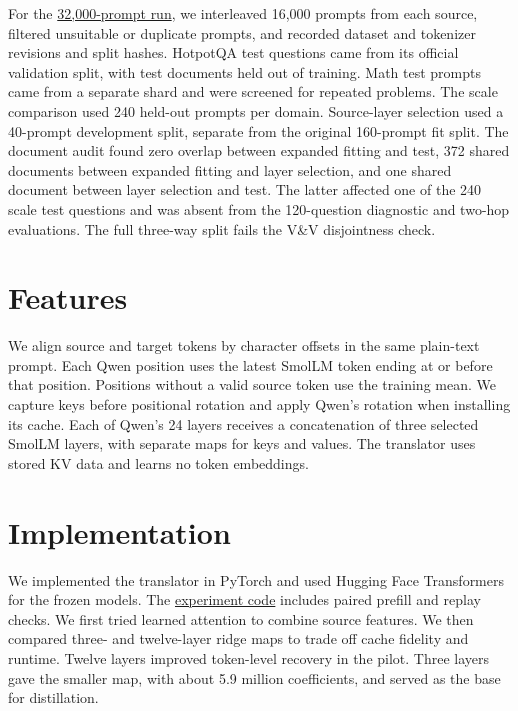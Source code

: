 \documentclass[11pt]{article}
\begin{document}
For the \href{https://huggingface.co/datasets/tandemkv/paired-kv-qwen-smollm/tree/27744a02d7d5f0abe61216612c46ec3b2a0bb52e/experiments/ridge-32k.C70bPO}{32,000-prompt run},
we interleaved 16,000 prompts from each source, filtered unsuitable or
duplicate prompts, and recorded dataset and tokenizer revisions and
split hashes. HotpotQA test questions came from its official validation
split, with test documents held out of training. Math test prompts came
from a separate shard and were screened for repeated problems. The
scale comparison used 240 held-out prompts per domain. Source-layer
selection used a 40-prompt development split, separate from the
original 160-prompt fit split. The document audit found zero overlap
between expanded fitting and test, 372 shared documents between
expanded fitting and layer selection, and one shared document between
layer selection and test. The latter affected one of the 240 scale
test questions and was absent from the 120-question diagnostic and
two-hop evaluations. The full three-way split fails the V\&V
disjointness check.

\section{Features}

We align source and target tokens by character offsets in the same
plain-text prompt. Each Qwen position uses the latest SmolLM token
ending at or before that position. Positions without a valid source
token use the training mean. We capture keys before positional rotation
and apply Qwen's rotation when installing its cache. Each of Qwen's
24 layers receives a concatenation of three selected SmolLM layers,
with separate maps for keys and values. The translator uses stored KV
data and learns no token embeddings.

\section{Implementation}

We implemented the translator in PyTorch and used Hugging Face
Transformers for the frozen models. The
\href{https://github.com/tandemkv/Tandem/pull/87}{experiment code}
includes paired prefill and replay checks. We first tried learned attention
to combine source features. We then compared three- and twelve-layer
ridge maps to trade off cache fidelity and runtime. Twelve layers
improved token-level recovery in the pilot. Three layers gave the
smaller map, with about 5.9 million coefficients, and served as the
base for distillation.
\end{document}
